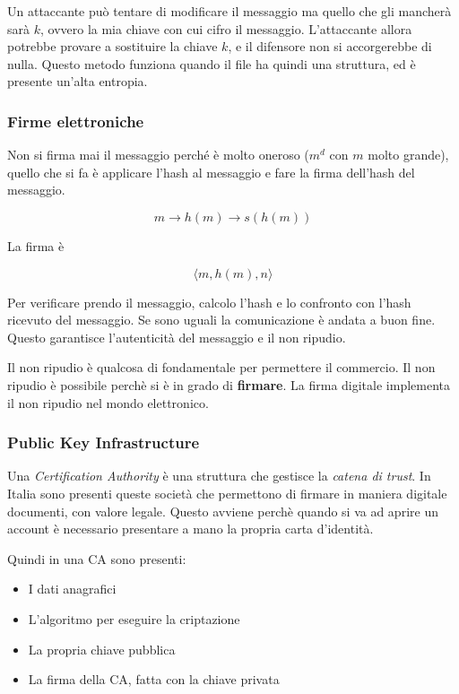 Un attaccante può tentare di modificare il messaggio ma quello che gli mancherà sarà $k$, ovvero la mia chiave con cui cifro il messaggio.
L'attaccante allora potrebbe provare a sostituire la chiave $k$, e il difensore non si accorgerebbe di nulla. Questo metodo funziona quando il file ha quindi una struttura, ed è presente un'alta entropia.


\subsubsection{Firme elettroniche}

Non si firma mai il messaggio perché è molto oneroso ($m^d$ con $m$ molto grande), quello che si fa è applicare l'hash al messaggio e fare la firma dell'hash del messaggio.

$$
m \rightarrow h(m) \rightarrow s(h(m))
$$

La firma è

$$
\langle m, h(m), n \rangle
$$

Per verificare prendo il messaggio, calcolo l'hash e lo confronto con l'hash ricevuto del messaggio. Se sono uguali la comunicazione è andata a buon fine. Questo garantisce l'autenticità del messaggio e il non ripudio.

Il non ripudio è qualcosa di fondamentale per permettere il commercio. Il non ripudio è possibile perchè si è in grado di \textbf{firmare}. La firma digitale implementa il non ripudio nel mondo elettronico.

\subsubsection{Public Key Infrastructure}


Una \textit{Certification Authority} è una struttura che gestisce la \textit{catena di trust}. In Italia sono presenti queste società che permettono di firmare in maniera digitale documenti, con valore legale. Questo avviene perchè quando si va ad aprire un account è necessario presentare a mano la propria carta d'identità.

Quindi in una CA sono presenti:
\begin{itemize}
\item I dati anagrafici
\item L'algoritmo per eseguire la criptazione
\item La propria chiave pubblica
\item La firma della CA, fatta con la chiave privata
\end{itemize}

